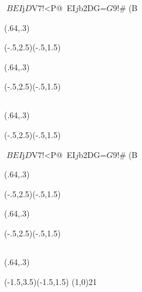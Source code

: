 \documentclass[a4j]{jarticle}
\begin{document}
$BEI$j$D$V$7!$<P@~EI$j$b2DG=$G$9!#(B

\begin{showEx}(.64,.3){}
\begin{pszahyou}[ul=10mm](-.5,2.5)(-.5,1.5)
  \Put{}
\end{pszahyou}
\end{showEx}

\begin{showEx}(.64,.3){}
\begin{pszahyou}[ul=10mm](-.5,2.5)(-.5,1.5)
  \Put{}
  \Put{}
\end{pszahyou}
\end{showEx}

\subsection{\texorpdfstring{}{yumigata}}
\begin{showEx}(.64,.3){}
\begin{pszahyou}[ul=10mm](-.5,2.5)(-.5,1.5)
  \Put{}
\end{pszahyou}
\end{showEx}

$BEI$j$D$V$7!$<P@~EI$j$b2DG=$G$9!#(B

\begin{showEx}(.64,.3){}
\begin{pszahyou}[ul=10mm](-.5,2.5)(-.5,1.5)
  \Put{}
\end{pszahyou}
\end{showEx}

\begin{showEx}(.64,.3){}
\begin{pszahyou}[ul=10mm](-.5,2.5)(-.5,1.5)
  \Put{}
  \Put{}
\end{pszahyou}
\end{showEx}

\subsection{\texorpdfstring{}{Daen}}

\begin{showEx}(.64,.3){}
\begin{pszahyou}[ul=5mm](-1.5,3.5)(-1.5,1.5)
  \def\A{(1,0)}
  \Daen\A{2}{1}
\end{pszahyou}
\end{showEx}
\end{document}
